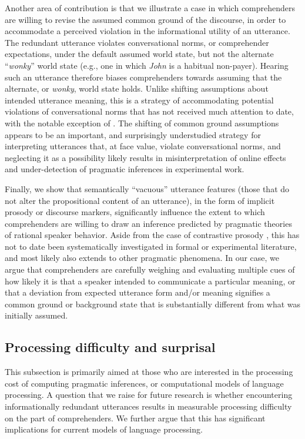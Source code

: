 Another area of contribution is that we illustrate a case in which
comprehenders are willing to revise the assumed common ground of the
discourse, in order to accommodate a perceived violation in the
informational utility of an utterance. The redundant utterance violates
conversational norms, or comprehender expectations, under the default
assumed world state, but not the alternate \enquote{\emph{wonky}} world
state (e.g., one in which \emph{John} is a habitual non-payer). Hearing
such an utterance therefore biases comprehenders towards assuming that
the alternate, or \emph{wonky}, world state holds. Unlike shifting
assumptions about intended utterance meaning, this is a strategy of
accommodating potential violations of conversational norms that has not
received much attention to date, with the notable exception of \citet{Degen2015a}. The shifting of common ground assumptions appears to be an
important, and surprisingly understudied strategy for interpreting
utterances that, at face value, violate conversational norms, and
neglecting it as a possibility likely results in misinterpretation of
online effects and under-detection of pragmatic inferences in
experimental work.

Finally, we show that semantically \enquote{vacuous} utterance features
(those that do not alter the propositional content of an utterance), in
the form of implicit prosody or discourse markers, significantly
influence the extent to which comprehenders are willing to draw an
inference predicted by pragmatic theories of rational speaker behavior.
Aside from the case of contrastive prosody \citep{Bergen2015,
Kurumada2012, Ward1985}, this has not to date
been systematically investigated in formal or experimental literature,
and most likely also extends to other pragmatic phenomena. In our case,
we argue that comprehenders are carefully weighing and evaluating
multiple cues of how likely it is that a speaker intended to communicate
a particular meaning, or that a deviation from expected utterance form
and/or meaning signifies a common ground or background state that is
substantially different from what was initially assumed.

\subsection{Processing difficulty and
surprisal}\label{processing-difficulty-and-surprisal}

This subsection is primarily aimed at those who are interested in the
processing cost of computing pragmatic inferences, or computational
models of language processing. A question that we raise for future
research is whether encountering informationally redundant utterances
results in measurable processing difficulty on the part of
comprehenders. We further argue that this has significant implications
for current models of language processing.

